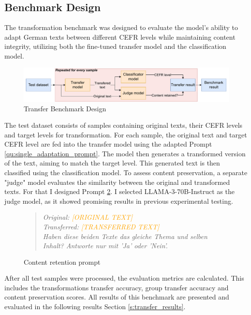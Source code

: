 \subsection{Benchmark Design}
\label{sss:transfer_benchmark}
The transformation benchmark was designed to evaluate the model's ability to adapt German texts between different CEFR levels while maintaining content integrity, utilizing both the fine-tuned transfer model and the classification model.

\begin{figure}[h]
    \centering
    \includegraphics[width=\textwidth]{img/TransferBenchmark3.pdf}
    \caption{Transfer Benchmark Design}
    \label{fig:transfer_benchmark}
\end{figure}

The test dataset consists of samples containing original texts, their CEFR levels and target levels for transformation. For each sample, the original text and target CEFR level are fed into the transfer model using the adapted Prompt \ref{qu:single_adaptation_prompt}.
The model then generates a transformed version of the text, aiming to match the target level. This generated text is then classified using the classification model. To assess content preservation, a separate "judge" model evaluates the similarity between the original and transformed texts. For that I designed Prompt \ref{qu:content_retention_prompt}. I selected LLAMA-3-70B-Instruct \citep{LLaMA3} as the judge model, as it showed promising results in previous experimental testing.

\captionsetup{labelformat=prompt}
\begin{figure}[h]
    \begin{quotation}
        \textit{Original: \textcolor{orange}{[ORIGINAL TEXT]} \\
        Transferred: \textcolor{orange}{[TRANSFERRED TEXT]} \\
        Haben diese beiden Texte das gleiche Thema und selben Inhalt? Antworte nur mit 'Ja' oder 'Nein'.}
    \end{quotation}
    \caption{Content retention prompt}
    \label{qu:content_retention_prompt}
\end{figure}
\captionsetup{labelformat=default}

After all test samples were processed, the evaluation metrics are calculated. This includes the transformations transfer accuracy, group transfer accuracy and content preservation scores. All results of this benchmark are presented and evaluated in the following results Section \ref{s:transfer_results}.